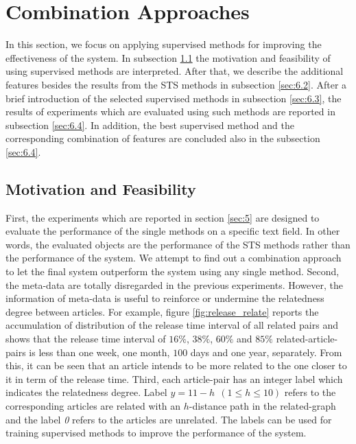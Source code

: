 \section{Combination Approaches}
\label{sec:6}

In this section, we focus on applying supervised methods for improving the effectiveness of the system. In subsection \ref{sec:6.1} the motivation and feasibility of using supervised methods are interpreted. After that, we describe the additional features besides the results from the STS methods in subsection \ref{sec:6.2}. After a brief introduction of the selected supervised methods in subsection \ref{sec:6.3}, the results of experiments which are evaluated using such methods are reported in subsection \ref{sec:6.4}. In addition, the best supervised method and the corresponding combination of features are concluded also in the subsection \ref{sec:6.4}.


\subsection{Motivation and Feasibility}
\label{sec:6.1}

First, the experiments which are reported in section \ref{sec:5} are designed to evaluate the performance of the single methods on a specific text field. In other words, the evaluated objects are the performance of the STS methods rather than the performance of the system. We attempt to find out a combination approach to let the final system outperform the system using any single method. Second, the meta-data are totally disregarded in the previous experiments. However, the information of meta-data is useful to reinforce or undermine the relatedness degree between articles. For example, figure \ref{fig:release_relate} reports the accumulation of distribution of the release time interval of all related pairs and shows that the release time interval of $16\%$, $38\%$, $60\%$ and $85\%$ related-article-pairs is less than one week, one month, $100$ days and one year, separately. From this, it can be seen that an article intends to be more related to the one closer to it in term of the release time. Third, each article-pair has an integer label which indicates the relatedness degree. Label $y=11-h ~~(1 \le h \le 10)$ refers to the corresponding articles are related with an $h$-distance path in the related-graph and the label \textit{0} refers to the articles are unrelated. The labels can be used for training supervised methods to improve the performance of the system. 

